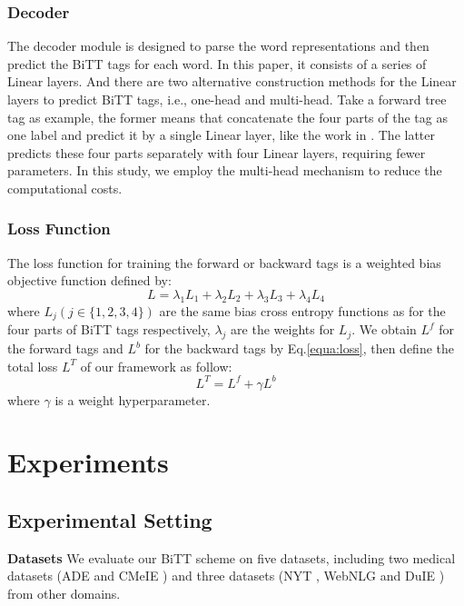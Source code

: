 \documentclass[conference]{IEEEtran}
\begin{document}
\subsubsection{Decoder}
\label{sssec:decoder}
The decoder module is designed to parse the word representations and then predict the BiTT tags for each word. In this paper, it consists of a series of Linear layers. And there are two alternative construction methods for the Linear layers to predict BiTT tags, i.e., one-head and multi-head. Take a forward tree tag as example, the former means that concatenate the four parts of the tag as one label and predict it by a single Linear layer, like the work in \cite{Zheng2017Joint}. The latter predicts these four parts separately with four Linear layers, requiring fewer parameters. In this study, we employ the multi-head mechanism to reduce the computational costs.

\subsubsection{Loss Function}
The loss function for training the forward or backward tags is a weighted bias objective function defined by:
\begin{equation}\label{equa:loss}
    L = {\lambda_1}{L_1} + {\lambda_2}{L_2} + {\lambda_3}{L_3} + {\lambda_4}{L_4}
\end{equation}
where $L_j(j \in \{1, 2, 3, 4\})$ are the same bias cross entropy functions as \cite{Zheng2017Joint} for the four parts of BiTT tags respectively, $\lambda_j$ are the weights for $L_j$. We obtain $L^f$ for the forward tags and $L^b$ for the backward tags by Eq.\eqref{equa:loss}, then define the total loss $L^T$ of our framework as follow:
\begin{equation}\label{equa:totalloss}
    L^T = L^f + {\gamma}{L^b}
\end{equation}
where $\gamma$ is a weight hyperparameter. 



\section{Experiments}
\label{sect:exper}
\subsection{Experimental Setting}
\textbf{Datasets}
We evaluate our BiTT scheme on five datasets, including two medical datasets (ADE \cite{Gurulingappa2012Development} and CMeIE \cite{Guan2020CMeIE}) and three datasets (NYT \cite{Riedel2010Modeling}, WebNLG \cite{Gardent2017Creating} and DuIE \cite{Li2019A}) from other domains. 
\end{document}

